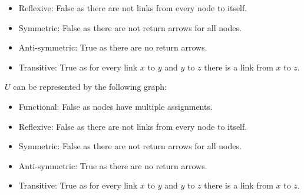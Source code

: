 \documentclass{article}
\begin{document}
\begin{enumerate}
\begin{enumerate}
{\begin{itemize}
                                                \item Reflexive: False as there are not links from every node to itself.
                                                \item Symmetric: False as there are not return arrows for all nodes.
                                                \item Anti-symmetric: True as there are no return arrows.
                                                \item Transitive: True as for every link $x$ to $y$ and $y$ to $z$ there is a link from $x$ to $z$.
                                        \end{itemize}
                                        $U$ can be represented by the following graph:
                                        \begin{figure}[H]
                                                \centering 
                                        \end{figure}
                                        \begin{itemize}
                                                \item Functional: False as nodes have multiple assignments.
                                                \item Reflexive: False as there are not links from every node to itself.
                                                \item Symmetric: False as there are not return arrows for all nodes.
                                                \item Anti-symmetric: True as there are no return arrows.
                                                \item Transitive: True as for every link $x$ to $y$ and $y$ to $z$ there is a link from $x$ to $z$.

\end{itemize}}
\end{enumerate}
\end{enumerate}
\end{document}
